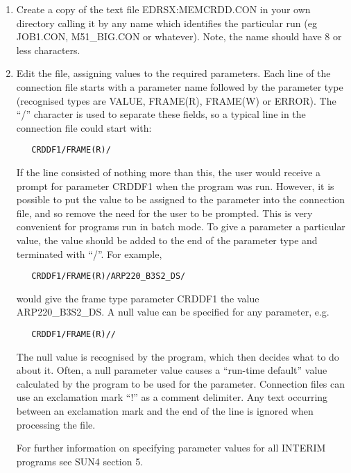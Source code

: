\begin{enumerate}

\item Create a copy of the text file EDRSX:MEMCRDD.CON in your own directory
calling it by any name which identifies the particular run (eg JOB1.CON,
M51\_BIG.CON or whatever). Note, the name should have 8 or less characters.

\item Edit the file, assigning values to the required parameters. Each line
of the connection file starts with a parameter name followed by the parameter
type (recognised types are VALUE, FRAME(R), FRAME(W) or ERROR). The ``/''
character is used to separate these fields, so a typical line in the
connection file could start with:

\begin{verbatim}
   CRDDF1/FRAME(R)/
\end{verbatim}

If the line consisted of nothing more than this, the user would receive a prompt
for parameter CRDDF1 when the program was run. However, it is possible to put
the value to be assigned to the parameter into the connection file, and so
remove the need for the user to be prompted. This is very convenient for
programs run in batch mode.
To give a parameter a particular value, the
value should be added to the end of the parameter type and terminated with
``/''. For example,

\begin{verbatim}
   CRDDF1/FRAME(R)/ARP220_B3S2_DS/
\end{verbatim}

would give the frame type parameter CRDDF1 the value ARP220\_B3S2\_DS. A null
value can be specified for any parameter, e.g.

\begin{verbatim}
   CRDDF1/FRAME(R)//
\end{verbatim}

The null value is recognised by the program, which then decides what to do
about  it. Often, a null parameter value causes a ``run-time default'' value
calculated  by the program to be used for the parameter. Connection files can
use an  exclamation mark ``!'' as a comment delimiter. Any text occurring
between an exclamation mark and the end of the line is ignored when processing
the file.

For further information on specifying parameter values
for all INTERIM programs see SUN4 section 5.


\end{enumerate}
